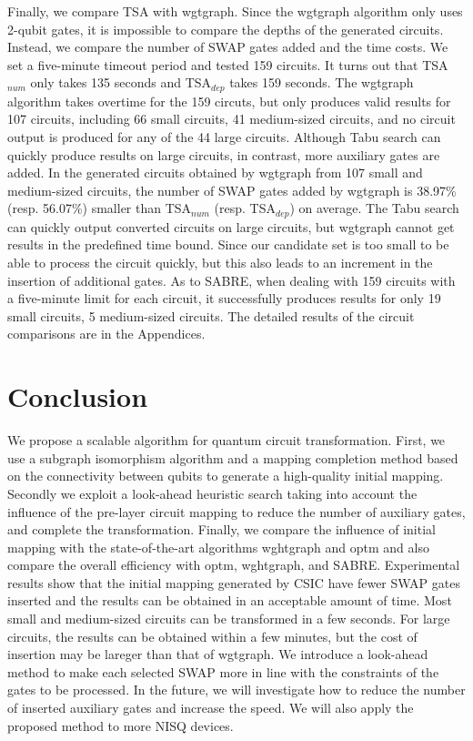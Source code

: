 \documentclass[journal]{IEEEtran}
\begin{document}
	Finally, we compare TSA with wgtgraph.  Since the wgtgraph algorithm only uses 2-qubit gates, 
	it is impossible to compare the depths of the generated circuits.  Instead, we compare the number of SWAP gates added and the time costs. 
  We set a five-minute timeout period and tested 159 circuits. It turns out that TSA$_{num}$ only takes 135 seconds and TSA$_{dep}$ takes 159 seconds. The  wgtgraph algorithm takes overtime for the 159 circuts,  but only produces valid results for 107 circuits, including 66 small circuits,  41 medium-sized circuits,  and no circuit output is produced for any of the 44 large circuits. Although Tabu search can quickly produce results on large circuits, in contrast,  more auxiliary gates are added.  In the generated circuits obtained by wgtgraph from 107 small and medium-sized circuits,  the number of SWAP gates added by wgtgraph is 38.97\% (resp. 56.07\%) smaller than TSA$_{num}$ (resp. TSA$_{dep}$) on average. The Tabu search can quickly output converted circuits on large circuits, but wgtgraph cannot get results in the predefined time bound. Since  our candidate set is too small to be able to process the circuit quickly, but this also leads to an increment in the insertion of additional gates. As to SABRE, when dealing with 159 circuits with a five-minute limit for each circuit, it successfully produces results for only 19 small circuits, 5 medium-sized circuits. The detailed results of the circuit comparisons are in the Appendices. 
  
  \section{Conclusion}
  \label{Conclusion}
  We propose a scalable algorithm for quantum circuit transformation. First, we use a subgraph isomorphism algorithm and a mapping completion method based on the connectivity between qubits to generate a high-quality initial mapping. Secondly we exploit a look-ahead heuristic search taking into account the influence of the pre-layer circuit mapping to reduce the number of auxiliary gates, and complete the transformation. Finally, we compare the influence of initial mapping  with the state-of-the-art algorithms wghtgraph and optm and also compare the overall efficiency with optm, wghtgraph, and SABRE.
  Experimental results show that the initial mapping generated by CSIC have fewer SWAP gates inserted and the results can be obtained in an acceptable amount of time. Most small and medium-sized circuits can be transformed in a few seconds.
  For large circuits, the results can be obtained within a few minutes,
  but the cost of insertion may be lareger than that of wgtgraph.
  We introduce a look-ahead method to make each selected SWAP more in line with the constraints of the gates to be processed.
  In the future, we will investigate how to reduce the number of inserted auxiliary gates  and increase the speed. We will also apply the proposed method to more NISQ devices.
\end{document}
